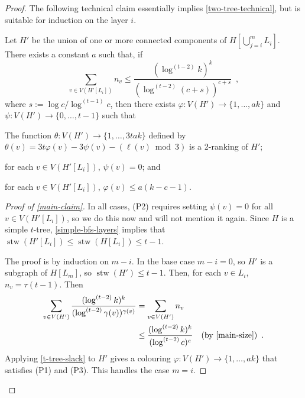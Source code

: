 \documentclass[kpfonts]{patmorin}
\DeclareMathOperator{\stw}{stw}
\theoremstyle{named}
\begin{document}
\begin{proof}
    The following technical claim essentially implies \cref{two-tree-technical}, but is suitable for induction on the layer $i$.

    \begin{clm}\label{main-claim}
        Let $H'$ be the union of one or more connected components of $H[\bigcup_{j=i}^m L_i]$. There exists a constant $a$ such that, if
        \begin{equation}
            \sum_{v\in V(H'[L_i])} n_v\le \frac{(\log^{(t-2)} k)^{k}}{(\log^{(t-2)} (c+s))^{c+s}} \enspace , \label{main-size}
        \end{equation}
        where $s:=\log c/\log^{(t-1)} c$,
        then there exists $\varphi:V(H')\to\{1,\ldots,ak\}$ and $\psi:V(H')\to\{0,\ldots,t-1\}$ such that
        \begin{compactenum}[(P1)]
            \item The function $\theta:V(H')\to\{1,\ldots,3tak\}$ defined by $\theta(v)=3t\varphi(v) - 3\psi(v) -(\ell(v)\bmod 3)$ is a 2-ranking of $H'$;
            \item for each $v\in V(H'[L_i])$, $\psi(v)=0$; and
            \item for each $v\in V(H'[L_i])$, $\varphi(v)\le a(k-c-1)$.
        \end{compactenum}
    \end{clm}

    \begin{proof}[Proof of \cref{main-claim}]
        In all cases, (P2) requires setting $\psi(v)=0$ for all $v\in V(H'[L_i])$, so we do this now and will not mention it again.  Since $H$ is a simple $t$-tree, \cref{simple-bfs-layers} implies that $\stw(H'[L_i])\le \stw(H[L_i])\le t-1$.

        The proof is by induction on $m-i$. In the base case $m-i=0$, so $H'$ is a subgraph of $H[L_m]$, so $\stw(H')\le t-1$.  Then, for each $v\in L_i$, $n_v=\tau(t-1)$.  Then
        \begin{align*}
            \sum_{v\in V(H')} \frac{(\log^{(t-2)} k)^k}{(\log^{(t-2)} \gamma(v))^{\gamma(v)}}
            & = \sum_{v\in V(H')} n_v \\
            & \le \frac{(\log^{(t-2)} k)^{k}}{(\log^{(t-2)} c)^c} & \text{(by \cref{main-size})} \enspace .
        \end{align*}
        Applying \cref{t-tree-slack} to $H'$ gives a colouring $\varphi: V(H')\to\{1,\ldots,ak\}$ that satisfies (P1) and (P3).  This handles the case $m=i$.


\end{proof}
\end{proof}
\end{document}
